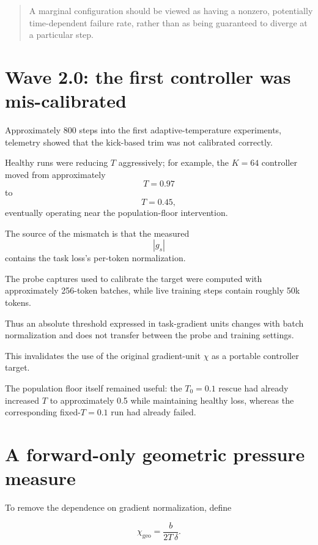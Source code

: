 \documentclass[11pt,a4paper]{article}
\newcommand{\chigeo}{\chi_{\mathrm{geo}}}
\begin{document}
\begin{quote}
A marginal configuration should be viewed as having a nonzero, potentially
time-dependent failure rate, rather than as being guaranteed to diverge at a
particular step.
\end{quote}


\section{Wave 2.0: the first controller was mis-calibrated}

Approximately 800 steps into the first adaptive-temperature experiments,
telemetry showed that the kick-based trim was not calibrated correctly.

Healthy runs were reducing \(T\) aggressively; for example, the \(K=64\)
controller moved from approximately
\[
T=0.97
\]
to
\[
T=0.45,
\]
eventually operating near the population-floor intervention.

The source of the mismatch is that the measured
\[
|g_s|
\]
contains the task loss's per-token normalization.

The probe captures used to calibrate the target were computed with
approximately 256-token batches, while live training steps contain roughly
50k tokens.

Thus an absolute threshold expressed in task-gradient units changes with batch
normalization and does not transfer between the probe and training settings.

This invalidates the use of the original gradient-unit \(\chi\) as a portable
controller target.

The population floor itself remained useful:
the \(T_0=0.1\) rescue had already increased \(T\) to approximately 0.5 while
maintaining healthy loss, whereas the corresponding fixed-\(T=0.1\) run had
already failed.


\section{A forward-only geometric pressure measure}

To remove the dependence on gradient normalization, define

\[
\boxed{
\chigeo
=
\frac{b}
{2T\,\delta}
}.
\]
\end{document}
